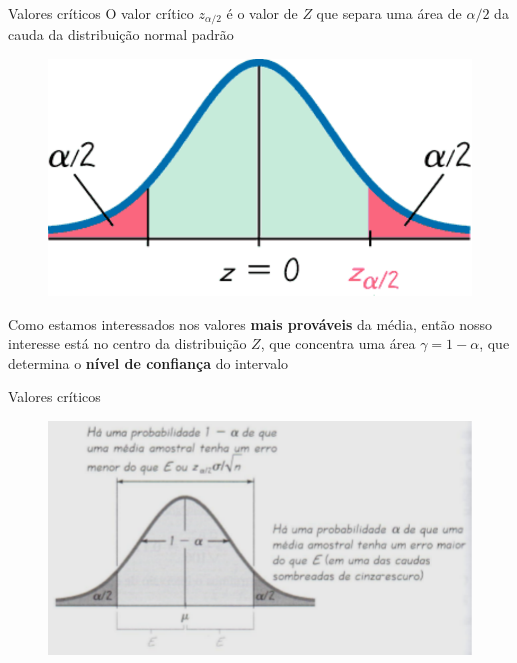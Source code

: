 \documentclass[10pt]{beamer}\usepackage[]{graphicx}\usepackage[]{color}
\theoremstyle{definition}
\begin{document}
\begin{frame}{Valores críticos}
  O valor crítico $z_{\alpha/2}$ é o valor de $Z$ que separa uma área de
  $\alpha/2$ da cauda da distribuição normal padrão
  \begin{figure}[h]
    \centering
    \includegraphics[width=.5\textwidth]{z_critico}
  \end{figure}
  Como estamos interessados nos valores \textbf{mais prováveis} da
  média, então nosso interesse está no centro da distribuição $Z$, que
  concentra uma área $\gamma = 1 - \alpha$, que determina o
  \textbf{nível de confiança} do intervalo
\end{frame}

\begin{frame}{Valores críticos}
  \begin{figure}[h]
    \centering
    \includegraphics[width=1\textwidth]{areas}
  \end{figure}
\end{frame}
\end{document}
